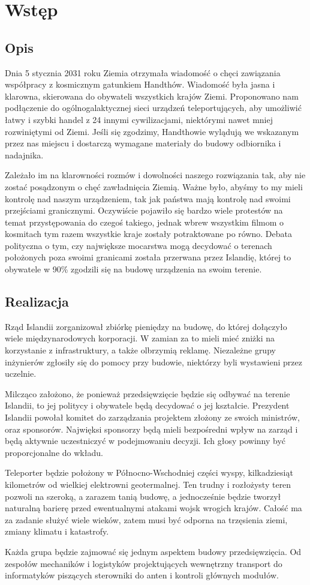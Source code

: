 \section{Wstęp}
\subsection{Opis}
Dnia 5 stycznia 2031 roku Ziemia otrzymała wiadomość o chęci zawiązania współpracy z kosmicznym gatunkiem Handthów.
Wiadomość była jasna i klarowna, skierowana do obywateli wszystkich krajów Ziemi.
Proponowano nam podłączenie do ogólnogalaktycznej sieci urządzeń teleportujących, aby umożliwić łatwy i szybki handel z 24 innymi cywilizacjami, niektórymi nawet mniej rozwiniętymi od Ziemi.
Jeśli się zgodzimy, Handthowie wylądują we wskazanym przez nas miejscu i dostarczą wymagane materiały do budowy odbiornika i nadajnika.

Zależało im na klarowności rozmów i dowolności naszego rozwiązania tak, aby nie zostać posądzonym o chęć zawładnięcia Ziemią.
Ważne było, abyśmy to my mieli kontrolę nad naszym urządzeniem, tak jak państwa mają kontrolę nad swoimi przejściami granicznymi.
Oczywiście pojawiło się bardzo wiele protestów na temat przystępowania do czegoś takiego, jednak wbrew wszystkim filmom o kosmitach tym razem wszystkie kraje zostały potraktowane po równo.
Debata polityczna o tym, czy największe mocarstwa mogą decydować o terenach położonych poza swoimi granicami została przerwana przez Islandię, której to obywatele w 90\% zgodzili się na budowę urządzenia na swoim terenie.

\subsection{Realizacja}
Rząd Islandii zorganizował zbiórkę pieniędzy na budowę, do której dołączyło wiele międzynarodowych korporacji.
W zamian za to mieli mieć zniżki na korzystanie z infrastruktury, a także olbrzymią reklamę.
Niezależne grupy inżynierów zgłosiły się do pomocy przy budowie, niektórzy byli wystawieni przez uczelnie.

Milcząco założono, że ponieważ przedsięwzięcie będzie się odbywać na terenie Islandii, to jej politycy i obywatele będą decydować o jej kształcie.
Prezydent Islandii powołał komitet do zarządzania projektem złożony ze swoich ministrów, oraz sponsorów.
Najwięksi sponsorzy będą mieli bezpośredni wpływ na zarząd i będą aktywnie uczestniczyć w podejmowaniu decyzji.
Ich głosy powinny być proporcjonalne do wkładu.

Teleporter będzie położony w Północno-Wschodniej części wyspy, kilkadziesiąt kilometrów od wielkiej elektrowni geotermalnej.
Ten trudny i rozłożysty teren pozwoli na szeroką, a zarazem tanią budowę, a jednocześnie będzie tworzył naturalną barierę przed ewentualnymi atakami wojsk wrogich krajów.
Całość ma za zadanie służyć wiele wieków, zatem musi być odporna na trzęsienia ziemi, zmiany klimatu i katastrofy.

Każda grupa będzie zajmować się jednym aspektem budowy przedsięwzięcia.
Od zespołów mechaników i logistyków projektujących wewnętrzny transport do informatyków piszących sterowniki do anten i kontroli głównych modułów.
